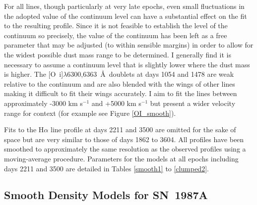 For all lines, though particularly at very late epochs, even small 
fluctuations in the adopted value of the continuum level can have a 
substantial effect on the fit to the resulting profile.  Since it is not 
feasible to establish the level of the continuum so precisely, the value 
of the continuum has been left as a free parameter that may be adjusted 
(to within sensible margins) in order to allow for the widest possible 
dust mass range to be determined.  I generally find it is necessary to 
assume a continuum level that is slightly lower where the dust mass is 
higher.  The [O~{\sc i}]$\lambda$6300,6363~\AA\ doublets at days 1054 and 
1478 are weak relative to the continuum and are also blended with the 
wings of other lines making it difficult to fit their wings accurately.  
I aim to fit the lines between approximately -3000 km s$^{-1}$ and +5000 
km s$^{-1}$ but present a wider velocity range for context (for example 
see Figure \ref{OI_smooth}).


Fits to the H$\alpha$ line profile at days 2211 and 3500 are omitted for 
the sake of space but are very similar to those of days 1862 to 3604.  
All profiles have been smoothed to approximately the same resolution as 
the observed profiles using a moving-average procedure.  Parameters for 
the models at all epochs including days 2211 and 3500 are detailed in 
Tables \ref{smooth1} to \ref{clumped2}.


\subsection{Smooth Density Models for SN~1987A}
\label{smooth_models}


